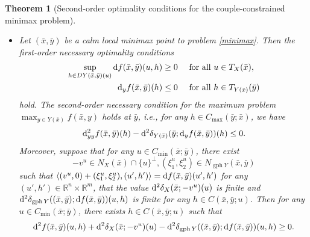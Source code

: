 \documentclass[11pt]{article}
\numberwithin{equation}{section}
\newtheorem{theorem}{Theorem}[section]
\begin{document}
{\begin{theorem}[Second-order optimality conditions for the couple-constrained minimax problem]
\begin{itemize}
\item[(a)] Let $(\bar x,\bar y)$ be a calm local minimax point to problem \eqref{minimax}. 
 Then the first-order necessary optimality conditions 
 \begin{align}
  \sup\limits_{h \in D Y(\bar x,\bar y)(u)} {\rm d} f(\bar x,\bar y)(u,h) \geq 0 \quad &\text { for all } u\in T_{X}(\bar x), \label{firstordercond11}\\
{\rm d}_y f(\bar x,\bar y)(h)\leq 0 \quad  &\text { for all } h \in T_{ Y(\bar x)}(\bar y)\label{firstordercond21}
   \end{align}
hold. 
The second-order necessary condition for the maximum problem $\max_{y\in Y(\bar x)} f(\bar x, y)$ holds at $\bar y$, i.e., for any $h\in C_{\max}(\bar y;\bar x)$, we have
\begin{equation*}\label{necelower1}
{\rm d}^2_{yy} f(\bar x,\bar y)(h) -{\rm d}^2 \delta_{Y(\bar x)}(\bar y;{\rm d}_yf(\bar x,\bar y))(h) \leq 0.
\end{equation*}
 Moreover, suppose that for any $u\in C_{\min}(\bar x; \bar y)$, there exist $$-v^u\in N_X(\bar x)\cap \{u\}^\perp, (\xi_1^u,\xi_2^u) \in N_{\operatorname{gph}Y}(\bar x,\bar y)$$ such that  $\langle (v^u,0)+(\xi_1^u,\xi_2^u), (u',h') \rangle = {\rm d} f(\bar x,\bar y)(u',h')$ for any $(u',h') \in \mathbb{R}^n \times \mathbb{R}^m$, that the value ${\rm d}^2 \delta_X(\bar x;-v^u)(u)$ is finite and ${\rm d}^2 \delta_{\operatorname{gph}Y}((\bar x,\bar y);{\rm d}f(\bar x,\bar y))(u,h)$ is finite for any $h \in C(\bar x,\bar y;u)$. Then 
 for any $u\in C_{\min}(\bar x; \bar y)$, there exists
 $h\in C(\bar x,\bar y;u)$ 
  such that
 \begin{equation*}\label{eqn4.111}
{\rm d}^2 f(\bar x,\bar y)(u,h) + {\rm d}^2 \delta_X(\bar x;-v^u)(u) -{\rm d}^2 \delta_{\operatorname{gph}Y}((\bar x,\bar y);{\rm d}f(\bar x,\bar y))(u,h)  \geq 0.
\end{equation*}


\end{itemize}
\end{theorem}}
\end{document}
